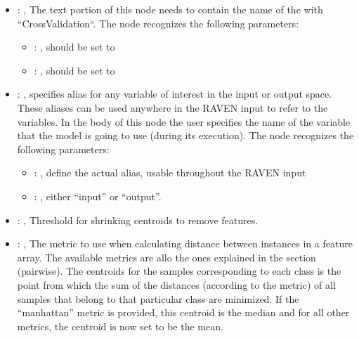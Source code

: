 \begin{itemize}
    \item {}: , 
      The text portion of this node needs to contain the name of the  with
               ``CrossValidation``.
      The  node recognizes the following parameters:
        \begin{itemize}
          \item {}: , 
            should be set to 
          \item {}: , 
            should be set to 
      \end{itemize}

    \item {}: , 
      specifies alias for         any variable of interest in the input or output space. These
      aliases can be used anywhere in the RAVEN input to         refer to the variables. In the body
      of this node the user specifies the name of the variable that the model is going to use
      (during its execution).
      The  node recognizes the following parameters:
        \begin{itemize}
          \item {}: , 
            define the actual alias, usable throughout the RAVEN input
          \item {}: , 
            either ``input'' or ``output''.
      \end{itemize}

    \item {}: , 
      Threshold for shrinking centroids to remove features.

    \item {}: , 
      The metric to use when calculating distance between instances in a feature array.
      The available metrics are allo the ones explained in the  section (pairwise).
      The centroids for the samples corresponding to each class is the point from which the sum of
      the distances (according to the metric) of all samples that belong to that particular class
      are                                                  minimized. If the ``manhattan'' metric is
      provided, this centroid is the median and for all other metrics,
      the centroid is now set to be the mean.
  \end{itemize}


